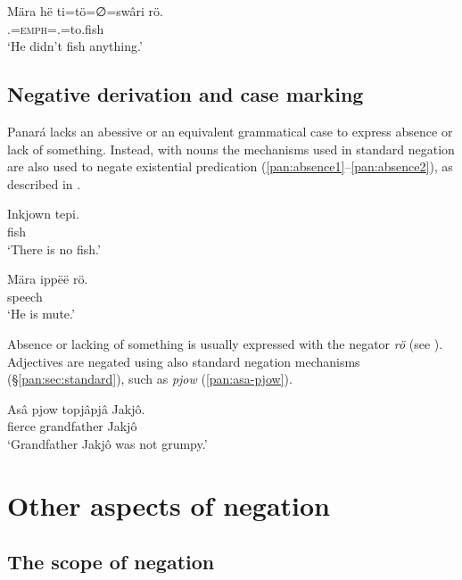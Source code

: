 \documentclass[output=paper,colorlinks,citecolor=brown,draft]{langscibook}
\begin{document}
\ea\label{pan:70}
    \gll Mära hë ti=tö=∅=swâri rö. \\
    \Tsg{} \Erg{} \Tsg.\Erg{}=\textsc{emph}=\Tsg.\Abs{}=to.fish \Neg{}  \\
    \glt `He didn't fish anything.' \\
\z

\subsection{Negative derivation and case marking}\label{pan:sec:deriv}

Panará lacks an abessive or an equivalent grammatical case to express absence or lack of something. Instead, with nouns the mechanisms used in standard negation are also used to negate existential predication (\ref{pan:absence1}--\ref{pan:absence2}), as described in .

\ea\label{pan:absence1}
    \gll Inkjown tepi. \\
    \Neg{} fish  \\
    \glt `There is no fish.' \\
\z

\ea\label{pan:absence2}
    \gll Mära ippëë rö. \\
    \Tsg{} speech \Neg{}  \\
    \glt `He is mute.' \\
\z

Absence or lacking of something is usually expressed with the negator \textit{rö} (see ). Adjectives are negated using also standard negation mechanisms (\S\ref{pan:sec:standard}), such as \textit{pjow} (\ref{pan:asa-pjow}).

\ea\label{pan:asa-pjow}
    \gll Asâ pjow topjâpjâ Jakjô. \\
    fierce \Neg{} grandfather Jakjô  \\
    \glt `Grandfather Jakjô was not grumpy.' \\
\z



\section{Other aspects of negation}\label{pan:sec:other}

\subsection{The scope of negation}\label{pan:sec:scope}
\end{document}
